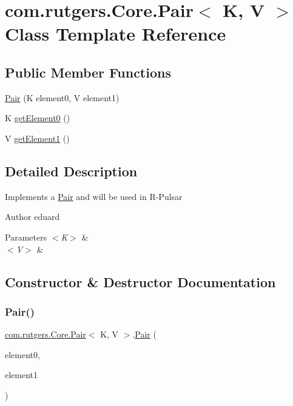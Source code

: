 \hypertarget{classcom_1_1rutgers_1_1Core_1_1Pair}{}\section{com.\+rutgers.\+Core.\+Pair$<$ K, V $>$ Class Template Reference}
\label{classcom_1_1rutgers_1_1Core_1_1Pair}
\subsection*{Public Member Functions}
\begin{DoxyCompactItemize}
\item 
\hyperlink{classcom_1_1rutgers_1_1Core_1_1Pair_a7953f3267ac99110e0e7446d5361cc62}{Pair} (K element0, V element1)
\item 
K \hyperlink{classcom_1_1rutgers_1_1Core_1_1Pair_aa1ee0d8fa231e29cbc7a7d3ad64738c2}{get\+Element0} ()
\item 
V \hyperlink{classcom_1_1rutgers_1_1Core_1_1Pair_a4815bd5515106b5d9fb2113f94b184d2}{get\+Element1} ()
\end{DoxyCompactItemize}


\subsection{Detailed Description}
Implements a \hyperlink{classcom_1_1rutgers_1_1Core_1_1Pair}{Pair} and will be used in R-\/\+Pulsar \begin{DoxyAuthor}{Author}
eduard 
\end{DoxyAuthor}

\begin{DoxyParams}{Parameters}
{\em $<$\+K$>$} & \\
\hline
{\em $<$\+V$>$} & \\
\hline
\end{DoxyParams}


\subsection{Constructor \& Destructor Documentation}
\mbox{\label{classcom_1_1rutgers_1_1Core_1_1Pair_a7953f3267ac99110e0e7446d5361cc62}} 
\subsubsection{\texorpdfstring{Pair()}{Pair()}}
{\footnotesize\ttfamily \hyperlink{classcom_1_1rutgers_1_1Core_1_1Pair}{com.\+rutgers.\+Core.\+Pair}$<$ K, V $>$.\hyperlink{classcom_1_1rutgers_1_1Core_1_1Pair}{Pair} (\begin{DoxyParamCaption}\item[{K}]{element0,  }\item[{V}]{element1 }\end{DoxyParamCaption})}

